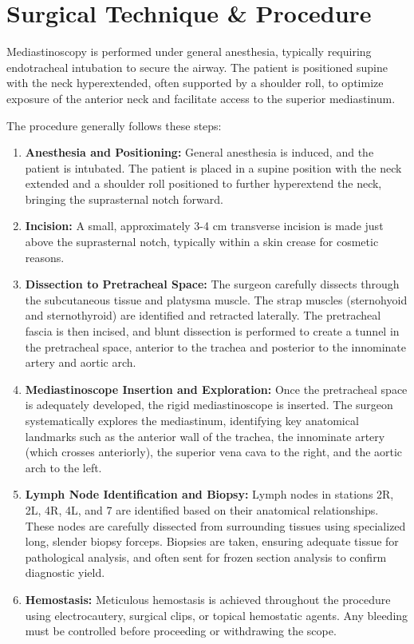 \section*{Surgical Technique \& Procedure}
Mediastinoscopy is performed under general anesthesia, typically requiring endotracheal intubation to secure the airway. The patient is positioned supine with the neck hyperextended, often supported by a shoulder roll, to optimize exposure of the anterior neck and facilitate access to the superior mediastinum.

The procedure generally follows these steps:
\begin{enumerate}
  \item \textbf{Anesthesia and Positioning:} General anesthesia is induced, and the patient is intubated. The patient is placed in a supine position with the neck extended and a shoulder roll positioned to further hyperextend the neck, bringing the suprasternal notch forward.
  \item \textbf{Incision:} A small, approximately 3-4 cm transverse incision is made just above the suprasternal notch, typically within a skin crease for cosmetic reasons.
  \item \textbf{Dissection to Pretracheal Space:} The surgeon carefully dissects through the subcutaneous tissue and platysma muscle. The strap muscles (sternohyoid and sternothyroid) are identified and retracted laterally. The pretracheal fascia is then incised, and blunt dissection is performed to create a tunnel in the pretracheal space, anterior to the trachea and posterior to the innominate artery and aortic arch.
  \item \textbf{Mediastinoscope Insertion and Exploration:} Once the pretracheal space is adequately developed, the rigid mediastinoscope is inserted. The surgeon systematically explores the mediastinum, identifying key anatomical landmarks such as the anterior wall of the trachea, the innominate artery (which crosses anteriorly), the superior vena cava to the right, and the aortic arch to the left.
  \item \textbf{Lymph Node Identification and Biopsy:} Lymph nodes in stations 2R, 2L, 4R, 4L, and 7 are identified based on their anatomical relationships. These nodes are carefully dissected from surrounding tissues using specialized long, slender biopsy forceps. Biopsies are taken, ensuring adequate tissue for pathological analysis, and often sent for frozen section analysis to confirm diagnostic yield.
  \item \textbf{Hemostasis:} Meticulous hemostasis is achieved throughout the procedure using electrocautery, surgical clips, or topical hemostatic agents. Any bleeding must be controlled before proceeding or withdrawing the scope.

\end{enumerate}
